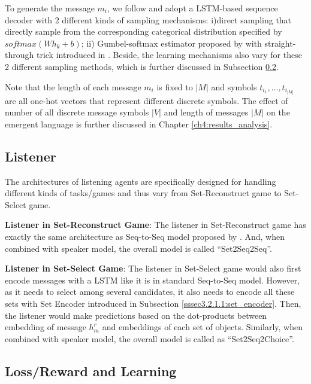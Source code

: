 To generate the message $m_i$, we follow \cite{havrylov2017emergence} and adopt a LSTM-based sequence decoder with 2 different kinds of sampling mechanisms: i)direct sampling that directly sample from the corresponding categorical distribution specified by $softmax(Wh_k + b)$; ii) Gumbel-softmax estimator proposed by \cite{jang2016categorical} with straight-through trick introduced in \cite{bengio2013estimating}. Beside, the learning mechanisms also vary for these 2 different sampling methods, which is further discussed in Subsection \ref{ssec3.2.3:loss_learning}.

Note that the length of each message $m_i$ is fixed to $|M|$ and symbols $t_{i_1},\dots,t_{i_|M|}$ are all one-hot vectors that represent different discrete symbols. The effect of number of all discrete message symbols $|V|$ and length of messages $|M|$ on the emergent language is further discussed in Chapter \ref{ch4:results_analysis}.

\subsection{Listener}
\label{ssec3.2.2:listeners}

The architectures of listening agents are specifically designed for handling different kinds of tasks/games and thus vary from Set-Reconstruct game to Set-Select game.

\noindent\textbf{Listener in Set-Reconstruct Game}: The listener in Set-Reconstruct game has exactly the same architecture as Seq-to-Seq model proposed by \cite{sutskever2014sequence}. And, when combined with speaker model, the overall model is called ``Set2Seq2Seq''.

\noindent\textbf{Listener in Set-Select Game}: The listener in Set-Select game would also first encode messages with a LSTM like it is in standard Seq-to-Seq model. However, as it needs to select among several candidates, it also needs to encode all these sets with Set Encoder introduced in Subsection \ref{sssec3.2.1.1:set_encoder}. Then, the listener would make predictions based on the dot-products between embedding of message $h^r_m$ and embeddings of each set of objects. Similarly, when combined with speaker model, the overall model is called as ``Set2Seq2Choice''.

\subsection{Loss/Reward and Learning}
\label{ssec3.2.3:loss_learning}

